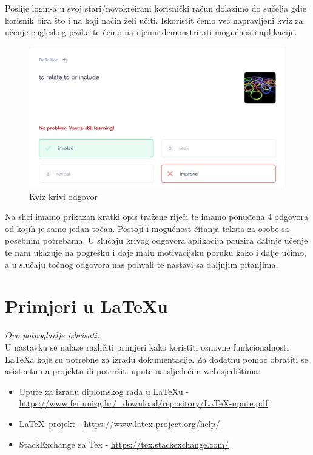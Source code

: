 Poslije login-a u svoj stari/novokreirani korisnički račun dolazimo do sučelja gdje korisnik bira što i na koji način želi učiti. Iskoristit ćemo već napravljeni kviz za učenje engleskog jezika te ćemo na njemu demonstrirati mogućnosti aplikacije. 

\begin{figure}[H]
	\includegraphics[width=\textwidth]{SlikeOpisProjekta/english_quiz_wrong_answer_quizlet.png} %
	\caption{Kviz krivi odgovor}
	\label{fig:EnglishQuizWrongAnswerQuizlet} %
\end{figure}

Na slici imamo prikazan kratki opis tražene riječi te imamo ponuđena 4 odgovora od kojih je samo jedan točan. Postoji i mogućnost čitanja teksta za osobe sa posebnim potrebama.
U slučaju krivog odgovora aplikacija pauzira daljnje učenje te nam ukazuje na pogrešku i daje malu motivacijsku poruku kako i dalje učimo, a u slučaju točnog odgovora nas pohvali te nastavi sa daljnjim pitanjima.

		\eject
		
		\section{Primjeri u \LaTeX u}
		
		\textit{Ovo potpoglavlje izbrisati.}\\

		U nastavku se nalaze različiti primjeri kako koristiti osnovne funkcionalnosti \LaTeX a koje su potrebne za izradu dokumentacije. Za dodatnu pomoć obratiti se asistentu na projektu ili potražiti upute na sljedećim web sjedištima:
		\begin{itemize}
			\item Upute za izradu diplomskog rada u \LaTeX u - \url{https://www.fer.unizg.hr/_download/repository/LaTeX-upute.pdf}
			\item \LaTeX\ projekt - \url{https://www.latex-project.org/help/}
			\item StackExchange za Tex - \url{https://tex.stackexchange.com/}\\
		
		\end{itemize} 	


